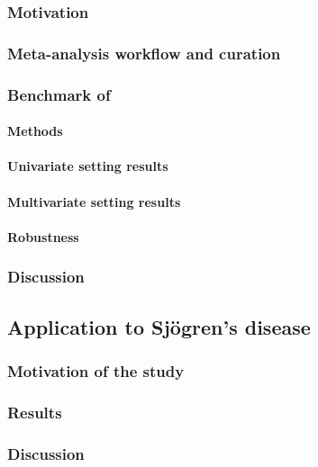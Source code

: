 \subsubsection{Motivation}
\subsubsection{Meta-analysis workflow and curation}
\subsubsection{Benchmark of }
\paragraph{Methods}
\paragraph{Univariate setting results}
\paragraph{Multivariate setting results}
\paragraph{Robustness}


\subsubsection{Discussion}


\subsection{Application to Sjögren's disease}
\subsubsection{Motivation of the study}
\subsubsection{Results}
\subsubsection{Discussion}


